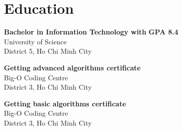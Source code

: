\documentclass[a4paper,10pt]{article}
\begin{document}
\begin{adjustbox}{valign=t}
\begin{minipage}{0.3\textwidth}
\vfill

\section*{Education}
	\begin{description}
	\raggedright
	\item [\normalfont \textcolor{ColorOne}{2022.}] \textbf{Bachelor in Information Technology with} {\large\textbf{{GPA 8.4}}}\\ 
	University of Science \\
	District 5, Ho Chi Minh City

	\item [\normalfont \textcolor{ColorOne}{2019.}] \textbf{Getting advanced algorithms certificate}\\
	Big-O Coding Centre\\
	District 3, Ho Chi Minh City

	\item [\normalfont \textcolor{ColorOne}{2018.}] \textbf{Getting basic algorithms certificate}\\
	Big-O Coding Centre\\
	District 3, Ho Chi Minh City
\end{description}

\vfill
\end{minipage}
\end{adjustbox}
%
%
%
\hfill
\begin{adjustbox}{valign=t}
\begin{minipage}{0.05\textwidth} %
\MyVerticalRule  %
\end{minipage}
\end{adjustbox}
\hfill
%
\end{document}
